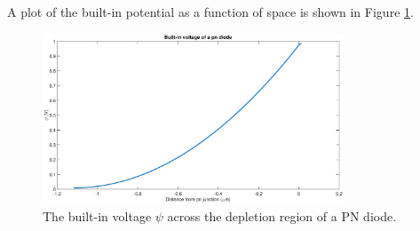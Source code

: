	A plot of the built-in potential as a function of space is shown in Figure \ref{fig::built_in}.
	
	\begin{figure}[htbp!]
		\centering
		\includegraphics[width=0.8\textwidth]{./img/2c_psi}
		\caption{The built-in voltage $\psi$ across the depletion region of a PN diode.}
		\label{fig::built_in}
	\end{figure}

